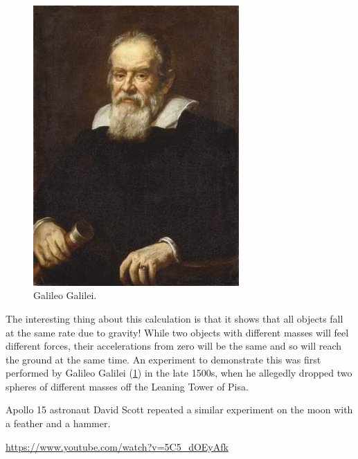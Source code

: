 \documentclass[a4paper]{amsbook}
\newcommand{\goandwatch}[1]{
\begin{center}
\begin{tcolorbox}[width=0.8\textwidth,colback={SkyBlue!20},title={\textbf{Go and watch...}},colbacktitle=MidnightBlue,coltitle=White]
  \textcolor{MidnightBlue}{\url{#1}}
\end{tcolorbox}
\end{center}}
\theoremstyle{definition}
\numberwithin{exercise}{chapter}
\numberwithin{exercise}{chapter}
\newcommand\capcite[1]{}
\begin{document}
\begin{figure}
  \centering
  \includegraphics[width=0.7\textwidth]{galileo}
  \caption{Galileo Galilei. \capcite{https://media1.britannica.com/eb-media/58/95758-004-BD98B43B.jpg}\label{fig:galileo}}
\end{figure}

The interesting thing about this calculation is that it shows that all objects fall at the same rate due to gravity! While two objects with
different masses will feel different forces, their accelerations from zero will be the same and so will reach the ground at the same time. An
experiment to demonstrate this was first performed by Galileo Galilei (\cref{fig:galileo}) in the late 1500s, when he allegedly dropped two
spheres of different masses off the Leaning Tower of Pisa.

Apollo 15 astronaut David Scott repeated a similar experiment on the moon with a feather and a hammer.

\goandwatch{https://www.youtube.com/watch?v=5C5_dOEyAfk}
\end{document}

